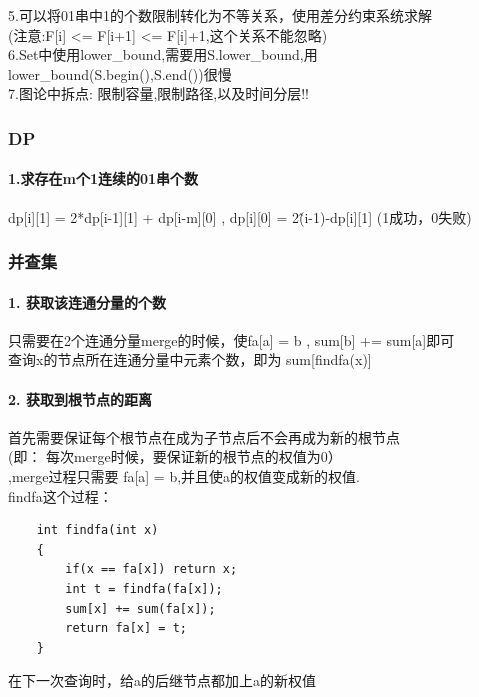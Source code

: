 \documentclass{article}
\begin{document}
5.可以将01串中1的个数限制转化为不等关系，使用差分约束系统求解 \\ (注意:F[i] <= F[i+1] <= F[i]+1,这个关系不能忽略) \\

6.Set中使用lower\_bound,需要用S.lower\_bound,用lower\_bound(S.begin(),S.end())很慢 \\

7.图论中拆点: 限制容量,限制路径,以及时间分层!!\\

\subsubsection{DP}
\paragraph{1.求存在m个1连续的01串个数\\}
  dp[i][1] = 2*dp[i-1][1] + dp[i-m][0] , dp[i][0] = 2\^(i-1)-dp[i][1] (1成功，0失败)\\
\subsubsection{并查集}
\paragraph{1. 获取该连通分量的个数\\}
只需要在2个连通分量merge的时候，使fa[a] = b , sum[b] += sum[a]即可\\
查询x的节点所在连通分量中元素个数，即为 sum[findfa(x)] \\

\paragraph{2. 获取到根节点的距离\\}
首先需要保证每个根节点在成为子节点后不会再成为新的根节点\\
(即： 每次merge时候，要保证新的根节点的权值为0） \\ ,merge过程只需要 fa[a] = b,并且使a的权值变成新的权值.\\
findfa这个过程：\\
\begin{lstlisting}
	int findfa(int x)
	{
		if(x == fa[x]) return x;
		int t = findfa(fa[x]);
		sum[x] += sum(fa[x]);
		return fa[x] = t;
	}
\end{lstlisting}
在下一次查询时，给a的后继节点都加上a的新权值\\
\end{document}
